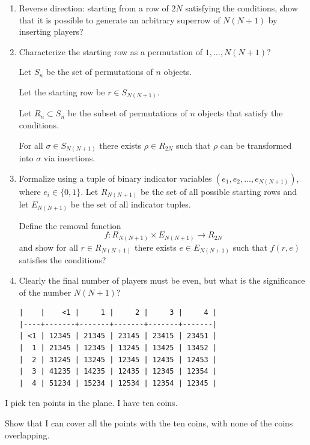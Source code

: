 \documentclass[12pt]{article}
\begin{document}
\begin{enumerate}
\item Reverse direction: starting from a row of $2N$ satisfying the conditions, show that it is
  possible to generate an arbitrary superrow of $N(N+1)$ by inserting players?
\item Characterize the starting row as a permutation of $1, \ldots, N(N+1)$?

  Let $S_n$ be the set of permutations of $n$ objects.

  Let the starting row be $r \in S_{N(N+1)}$.

  Let $R_n \subset S_n$ be the subset of permutations of $n$ objects that satisfy the conditions.

  \begin{claim*}
    For all $\sigma \in S_{N(N+1)}$ there exists $\rho \in R_{2N}$ such that $\rho$ can be
    transformed into $\sigma$ via insertions.
  \end{claim*}

\item Formalize using a tuple of binary indicator variables $(e_1, e_2, \ldots, e_{N(N+1)})$, where
  $e_i \in \{0, 1\}$. Let $R_{N(N+1)}$ be the set of all possible starting rows and let $E_{N(N+1)}$
    be the set of all indicator tuples.

  Define the removal function
  $$f:R_{N(N+1)} \times E_{N(N+1)} \to R_{2N}$$
  and show for all $r \in R_{N(N+1)}$ there exists $e \in E_{N(N+1)}$ such that $f(r, e)$ satisfies
  the conditions?
\item Clearly the final number of players must be even, but what is the significance of the number
  $N(N+1)$?

\begin{verbatim}
|    |    <1 |     1 |     2 |     3 |     4 |
|----+-------+-------+-------+-------+-------|
| <1 | 12345 | 21345 | 23145 | 23415 | 23451 |
|  1 | 21345 | 12345 | 13245 | 13425 | 13452 |
|  2 | 31245 | 13245 | 12345 | 12435 | 12453 |
|  3 | 41235 | 14235 | 12435 | 12345 | 12354 |
|  4 | 51234 | 15234 | 12534 | 12354 | 12345 |
\end{verbatim}
\end{enumerate}

\newpage
\begin{mdframed}
   I pick ten points in the plane. I have ten coins.

   Show that I can cover all the points with the ten coins, with none of the coins overlapping.
\end{mdframed}
\end{document}
